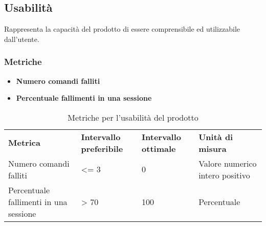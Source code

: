 %
%
%
%


\subsection{Usabilità}
Rappresenta la capacità del prodotto di essere comprensibile ed utilizzabile dall'utente.
\subsubsection{Metriche}
\begin{itemize}
	\item \textbf{Numero comandi falliti}
	\item \textbf{Percentuale fallimenti in una sessione}
\end{itemize}

\renewcommand{\arraystretch}{2.2}
\begin{longtable}{|C{4.5cm}|C{2.25cm}|C{2.25cm}|C{3cm}|}

	\caption{Metriche per l'usabilità del prodotto}\\
	\hline

	\textbf{Metrica} & \textbf{Intervallo preferibile}  & \textbf{Intervallo ottimale} & \textbf{Unità di misura}
	\tabularnewline
	\endfirsthead

	Numero comandi falliti &  <= 3 & 0 & Valore numerico intero positivo \\
	Percentuale fallimenti in una sessione &  > 70 & 100 & Percentuale \\
\end{longtable}



